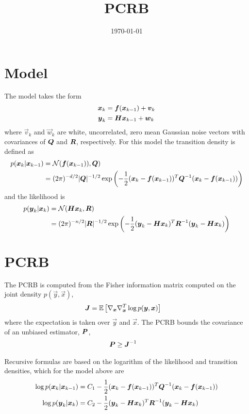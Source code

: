 \documentclass{article}
\title{PCRB}
\date{\today}
\begin{document}
\section{Model}

The model takes the form
\begin{subequations}
\begin{align}
	{\boldsymbol x}_k &= {\boldsymbol f}({\boldsymbol x}_{k-1}) + {\boldsymbol v}_k \\
	{\boldsymbol y}_k &= \boldsymbol{H}{\boldsymbol x}_{k-1} + {\boldsymbol w}_k
\end{align}
\label{eqn:model_general}
\end{subequations}
where $\vec v_k$ and $\vec w_k$ are white, uncorrelated, zero mean Gaussian noise vectors with covariances of $\boldsymbol{Q}$ and $\boldsymbol{R}$, respectively. For this model the transition density is defined as
\begin{align}
	p({\boldsymbol x}_k|{\boldsymbol x}_{k-1}) &= \mathcal N({\boldsymbol f}({\boldsymbol x}_{k-1})),\boldsymbol{Q}) \\
	&= (2\pi)^{-d/2} |\boldsymbol{Q}|^{-1/2} \exp\left(-\frac{1}{2}({\boldsymbol x}_k - {\boldsymbol f}({\boldsymbol x}_{k-1}))^T \boldsymbol{Q}^{-1} ({\boldsymbol x}_k - {\boldsymbol f}({\boldsymbol x}_{k-1})) \right)
\end{align}
and the likelihood is
\begin{align}
	p({\boldsymbol y}_k|{\boldsymbol x}_k) &= \mathcal N(\boldsymbol{H}{\boldsymbol x}_k,\boldsymbol{R}) \\
	&= (2\pi)^{-n/2} |\boldsymbol{R}|^{-1/2} \exp\left(-\frac{1}{2}({\boldsymbol y}_k - \boldsymbol{H}{\boldsymbol x}_k)^T \boldsymbol{R}^{-1} ({\boldsymbol y}_k - \boldsymbol{H}{\boldsymbol x}_k) \right)
\end{align}

\section{PCRB}

The PCRB is computed from the Fisher information matrix computed on the joint density $p(\vec y,\vec x)$,
\begin{align}
	\boldsymbol{J} &= \mathbb E\left[ \nabla_{{\boldsymbol x}}\nabla_{{\boldsymbol x}}^T \log p({\boldsymbol y},{\boldsymbol x}) \right]
\end{align}
where the expectation is taken over $\vec y$ and $\vec x$. The PCRB bounds the covariance of an unbiased estimator, $\boldsymbol{P}$,
\begin{align}
	\boldsymbol{P} &\ge \boldsymbol{J}^{-1}
\end{align}


Recursive formulas are based on the logarithm of the likelihood and transition densities, which for the model above are
\begin{align}
	\log p({\boldsymbol x}_k|{\boldsymbol x}_{k-1}) &= C_1 -\frac{1}{2}({\boldsymbol x}_k - {\boldsymbol f}({\boldsymbol x}_{k-1}))^T \boldsymbol{Q}^{-1} ({\boldsymbol x}_k - {\boldsymbol f}({\boldsymbol x}_{k-1})) \\
	\log p({\boldsymbol y}_k|{\boldsymbol x}_k) &= C_2 -\frac{1}{2}({\boldsymbol y}_k - \boldsymbol{H}{\boldsymbol x}_k)^T \boldsymbol{R}^{-1} ({\boldsymbol y}_k - \boldsymbol{H}{\boldsymbol x}_k)
\end{align}
\end{document}
